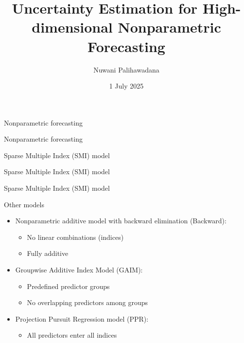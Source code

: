 \documentclass[
  12pt,
  ignorenonframetext,
  aspectratio=169,
]{beamer}
\title{Uncertainty Estimation for High-dimensional Nonparametric
Forecasting}
\author{Nuwani Palihawadana}
\date{1 July 2025}
\begin{document}
\frame{\titlepage}


\begin{frame}{Nonparametric forecasting}
\label{nonparametric-forecasting}
\end{frame}

\begin{frame}{Nonparametric forecasting}
\label{nonparametric-forecasting-1}
\end{frame}

\begin{frame}{Sparse Multiple Index (SMI) model}
\label{sparse-multiple-index-smi-model}
\end{frame}

\begin{frame}{Sparse Multiple Index (SMI) model}
\label{sparse-multiple-index-smi-model-1}
\end{frame}

\begin{frame}{Sparse Multiple Index (SMI) model}
\label{sparse-multiple-index-smi-model-2}
\end{frame}

\begin{frame}{Other models}
\label{other-models}
\begin{itemize}
  \item \color{violet} Nonparametric additive model with backward elimination (Backward):
  \begin{itemize}
    \item No linear combinations (indices)
    \item Fully additive \newline
  \end{itemize}
  \pause
  \item \color{violet} Groupwise Additive Index Model (GAIM):
  \begin{itemize}
    \item Predefined predictor groups
    \item No overlapping predictors among groups \newline
  \end{itemize}
  \pause
  \item \color{violet} Projection Pursuit Regression model (PPR):
  \begin{itemize}
    \item All predictors enter all indices
  \end{itemize}
\end{itemize}
\end{frame}
\end{document}
